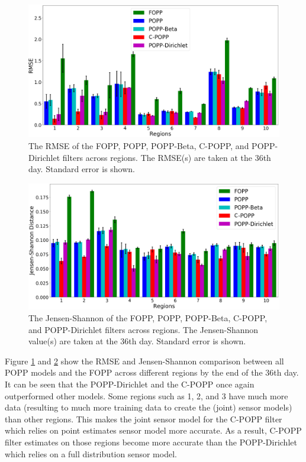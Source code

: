 \begin{figure}[t!]
	\centering
	\includegraphics[width=0.95\columnwidth]{./figures/fopp_popp_popb_npop_popd_rmse.png}
	\caption{The RMSE of the FOPP, POPP, POPP-Beta, C-POPP, and POPP-Dirichlet filters across regions. The RMSE(s) are taken at the 36th day. Standard error is shown.}
	\label{fig:fopp_popp_popb_npop_popd_rmse}
\end{figure}

\begin{figure}[t!]
	\centering
	\includegraphics[width=0.95\columnwidth]{./figures/fopp_popp_popb_npop_popd_kl.png}
	\caption{The Jensen-Shannon of the FOPP, POPP, POPP-Beta, C-POPP, and POPP-Dirichlet filters across regions. The Jensen-Shannon value(s) are taken at the 36th day. Standard error is shown.}
	\label{fig:fopp_popp_popb_npop_popd_kl}
\end{figure}


Figure \ref{fig:fopp_popp_popb_npop_popd_rmse} and \ref{fig:fopp_popp_popb_npop_popd_kl} show the RMSE and Jensen-Shannon comparison between all POPP models and the FOPP across different regions by the end of the 36th day. It can be seen that the POPP-Dirichlet and the C-POPP once again outperformed other models. Some regions such as 1, 2, and 3 have much more data (resulting to much more training data to create the (joint) sensor models) than other regions. This makes the joint sensor model for the C-POPP filter which relies on point estimates sensor model more accurate. As a result, C-POPP filter estimates on those regions become more accurate than the POPP-Dirichlet which relies on a full distribution sensor model. 

